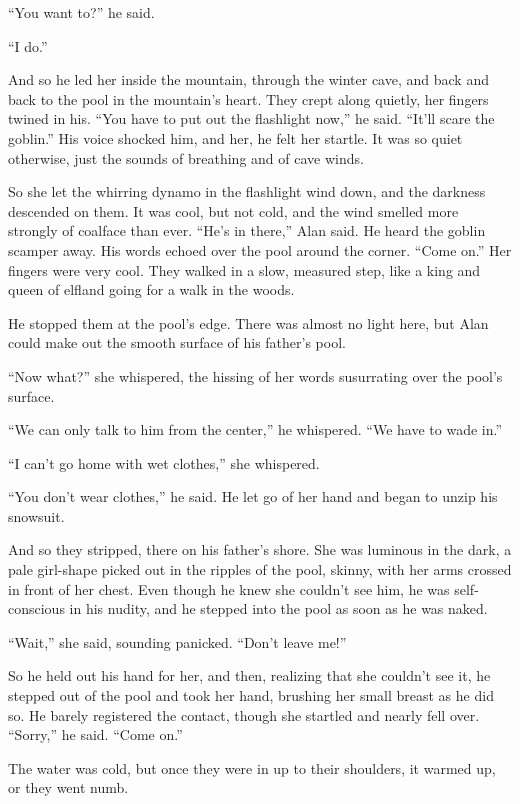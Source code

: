 ``You want to?'' he said.

``I do.''

And so he led her inside the mountain, through the winter cave, and
back and back to the pool in the mountain's heart.  They crept along
quietly, her fingers twined in his.  ``You have to put out the
flashlight now,'' he said.  ``It'll scare the goblin.'' His voice
shocked him, and her, he felt her startle.  It was so quiet otherwise,
just the sounds of breathing and of cave winds.

So she let the whirring dynamo in the flashlight wind down, and the
darkness descended on them.  It was cool, but not cold, and the wind
smelled more strongly of coalface than ever.  ``He's in there,'' Alan
said.  He heard the goblin scamper away.  His words echoed over the
pool around the corner.  ``Come on.'' Her fingers were very cool. 
They walked in a slow, measured step, like a king and queen of elfland
going for a walk in the woods.

He stopped them at the pool's edge.  There was almost no light here,
but Alan could make out the smooth surface of his father's pool.

``Now what?'' she whispered, the hissing of her words susurrating over
the pool's surface.

``We can only talk to him from the center,'' he whispered.  ``We have
to wade in.''

``I can't go home with wet clothes,'' she whispered.

``You don't wear clothes,'' he said.  He let go of her hand and began
to unzip his snowsuit.

And so they stripped, there on his father's shore.  She was luminous
in the dark, a pale girl-shape picked out in the ripples of the pool,
skinny, with her arms crossed in front of her chest.  Even though he
knew she couldn't see him, he was self-conscious in his nudity, and he
stepped into the pool as soon as he was naked.

``Wait,'' she said, sounding panicked.  ``Don't leave me!''

So he held out his hand for her, and then, realizing that she couldn't
see it, he stepped out of the pool and took her hand, brushing her
small breast as he did so.  He barely registered the contact, though
she startled and nearly fell over.  ``Sorry,'' he said.  ``Come on.''

The water was cold, but once they were in up to their shoulders, it
warmed up, or they went numb.

